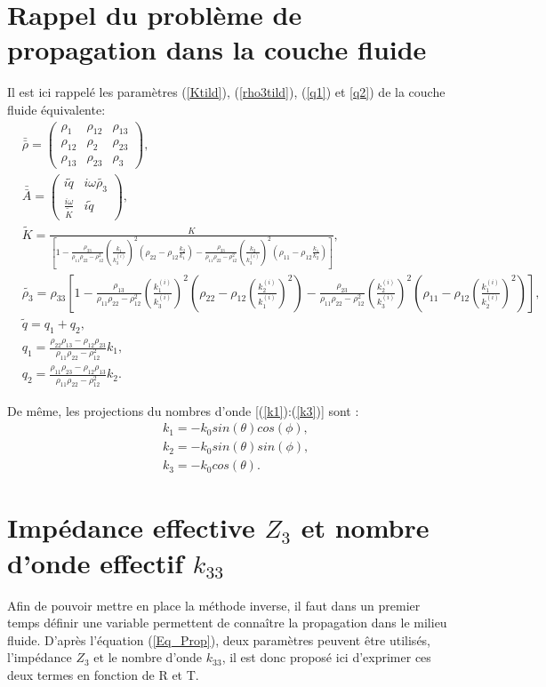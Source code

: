 \documentclass[12pt]{report}
\begin{document}
\section{Rappel du problème de propagation dans la couche fluide}
\label{Ch_Inv_S_Pb}
    Il est ici rappelé  les paramètres (\ref{Ktild}), (\ref{rho3tild}), (\ref{q1}) et \ref{q2})  de la couche fluide équivalente:
    \begin{align*}
	    &\bar{\bar{\rho}}=\begin{pmatrix} \rho_1 & \rho_{12} & \rho_{13} \\ \rho_{12} & \rho_2 & \rho_{23} \\ \rho_{13} & \rho_{23} & \rho_3 \end{pmatrix},\\
        &\bar{\bar{A}}=\begin{pmatrix} i \tilde{q} & i \omega \tilde{\rho_3} \\ \frac{i \omega}{\tilde{K}} & i \tilde{q} \end{pmatrix},\\
	    &\tilde{K}=\frac{K}{[1-\frac{\rho_{33}}{\rho_{11}\rho_{22}-\rho_{12}^2}(\frac{k_1}{k_3^{(i)}})^2(\rho_{22}-\rho_{12}\frac{k_2}{k_1})-\frac{\rho_{33}}{\rho_{11}\rho_{22}-\rho_{12}^2}(\frac{k_2}{k_3^{(i)}})^2(\rho_{11}-\rho_{12}\frac{k_1}{k_2})]},\\
        &\tilde{\rho_3}=\rho_{33}[1-\frac{\rho_{13}}{\rho_{11}\rho_{22}-\rho_{12}^2}(\frac{k_1^{(i)}}{k_3^{(i)}})^2(\rho_{22}-\rho_{12}(\frac{k_2^{(i)}}{k_1^{(i)}})^2)-\frac{\rho_{23}}{\rho_{11}\rho_{22}-\rho_{12}^2}(\frac{k_2^{(i)}}{k_3^{(i)}})^2(\rho_{11}-\rho_{12}(\frac{k_1^{(i)}}{k_2^{(i)}})^2)], \\
        &\tilde{q}=q_1+q_2,\\
	    &q_{1}=\frac{\rho_{22}\rho_{13}-\rho_{12}\rho_{23}}{\rho_{11}\rho_{22}-\rho_{12}^2}k_1,\\
        &q_{2}= \frac{\rho_{11}\rho_{23}-\rho_{12}\rho_{13}}{\rho_{11}\rho_{22}-\rho_{12}^2}k_2.
    \end{align*}
    
    De même, les projections du nombres d'onde [(\ref{k1}):(\ref{k3})] sont :
    \begin{align*}
    &k_1=-k_0 sin(\theta) cos(\phi), \\
    &k_2=-k_0 sin(\theta) sin(\phi), \\
    &k_3= -k_0 cos(\theta).
    \end{align*}
          
     
\section{Impédance effective $Z_3$ et nombre d'onde effectif $k_{33}$}
\label{Ch_Inv_S_Z3}
Afin de pouvoir mettre en place la méthode inverse, il faut dans un premier temps définir une variable permettent de connaître la propagation dans le milieu fluide. D'après l'équation (\ref{Eq_Prop}), deux paramètres peuvent être utilisés, l'impédance $Z_3$ et le nombre d'onde $k_{33}$, il est donc proposé ici d'exprimer ces deux termes en fonction de R et T.
    
\end{document}
